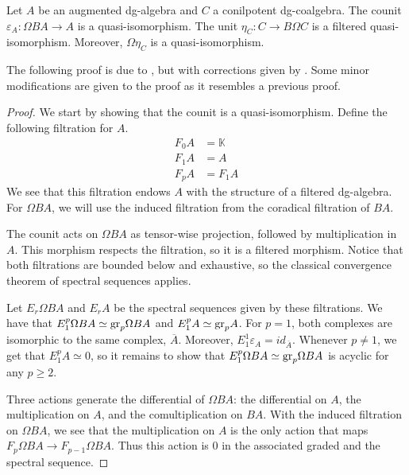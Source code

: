 \documentclass[../thesis.tex]{subfiles}
\begin{document}
            \begin{proposition}\label{prop: unit-counit-qif}
                Let $A$ be an augmented dg-algebra and $C$ a conilpotent dg-coalgebra. The counit $\varepsilon_A: \Omega BA \rightarrow A$ is a quasi-isomorphism. The unit $\eta_C: C \rightarrow B\Omega C$ is a filtered quasi-isomorphism. Moreover, $\Omega \eta_C$ is a quasi-isomorphism.
            \end{proposition}

            The following proof is due to \cite{LefevreHasegawa03}, but with corrections given by \cite{Keller05}. Some minor modifications are given to the proof as it resembles a previous proof.

            \begin{proof}
               We start by showing that the counit is a quasi-isomorphism. Define the following filtration for $A$.
                \begin{align*}
                    F_0A & = \mathbb{K} \\
                    F_1A & = A \\
                    F_pA & = F_1A 
                \end{align*}
                We see that this filtration endows $A$ with the structure of a filtered dg-algebra. For $\Omega BA$, we will use the induced filtration from the coradical filtration of $BA$.

                The counit acts on $\Omega BA$ as tensor-wise projection, followed by multiplication in $A$. This morphism respects the filtration, so it is a filtered morphism. Notice that both filtrations are bounded below and exhaustive, so the classical convergence theorem of spectral sequences applies.

                Let $E_r\Omega BA$ and $E_rA$ be the spectral sequences given by these filtrations. We have that $E_1^{p}\Omega BA \simeq \tt{gr}_p \Omega BA$ and $E_1^{p}A \simeq \tt{gr}_pA$. For $p=1$, both complexes are isomorphic to the same complex, $\overline{A}$. Moreover, $E_1^{1}\varepsilon_A = id_{\overline{A}}$. Whenever $p\neq 1$, we get that $E_1^p A \simeq 0$, so it remains to show that $E_1^p \Omega BA \simeq \tt{gr}_p \Omega BA$ is acyclic for any $p \geq 2$.

                Three actions generate the differential of $\Omega BA$: the differential on $A$, the multiplication on $A$, and the comultiplication on $BA$. With the induced filtration on $\Omega BA$, we see that the multiplication on $A$ is the only action that maps $F_p\Omega BA \rightarrow F_{p-1}\Omega BA$. Thus this action is $0$ in the associated graded and the spectral sequence. 


\end{proof}
\end{document}
